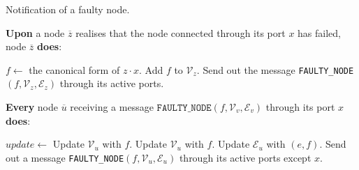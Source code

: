 \begin{algorithm}[htbp]
\caption{Notification of a faulty node.}
\label{al:nfailure_notif}
\textbf{Upon} a node $\overline{z}$ realises that the node connected through its port $x$ has failed, node $\overline{z}$ \textbf{does}:

\begin{algorithmic}[1]
	\STATE $f\leftarrow$ the canonical form of $z\cdot x$.
    \STATE Add $f$ to $\mathcal{V}_{z}$.
    \STATE Send out the message \texttt{FAULTY\_NODE}$(f,\mathcal{V}_z, \mathcal{E}_z)$ through its active ports.
\end{algorithmic}
\textbf{Every} node $\overline{u}$ receiving a message $\texttt{FAULTY\_NODE}(f,\mathcal{V}_v, \mathcal{E}_v)$ through its port $x$ \textbf{does}:

\begin{algorithmic}[1]
	\STATE $update\leftarrow$ Update $\mathcal{V}_u$ with $f$. 
    	\STATE Update $\mathcal{V}_u$ with $f$. 
    \ENDFOR
    	\STATE Update $\mathcal{E}_u$ with $(e,f)$. 
    \ENDFOR
    	\STATE Send out a message \texttt{FAULTY\_NODE}$(f,\mathcal{V}_u, \mathcal{E}_u)$ through its active ports except $x$.
    \ENDIF
\end{algorithmic}
\end{algorithm}